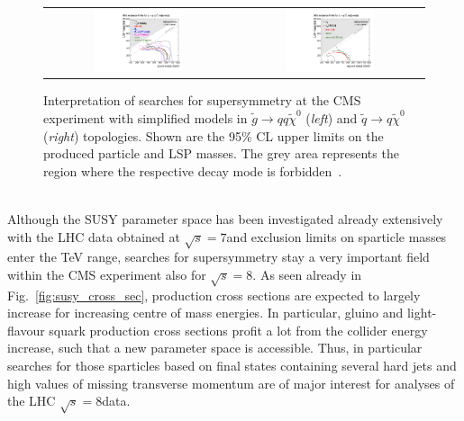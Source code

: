 \begin{figure}[!tp]
  \centering 
  \begin{tabular}{cc}
    \includegraphics[width=0.49\textwidth]{figures/T1_7TeV.pdf} &
    \includegraphics[width=0.49\textwidth]{figures/T2_7TeV.pdf}
  \end{tabular}
  \caption{Interpretation of searches for supersymmetry at the CMS experiment with simplified models in $\tilde{g} \rightarrow qq\tilde{\chi}^0$ (\textit{left}) and $\tilde{q} \rightarrow q \tilde{\chi}^0$ (\textit{right}) topologies. Shown are the 95\% CL upper limits on the produced particle and LSP masses. The grey area represents the region where the respective decay mode is forbidden~\cite{Chatrchyan:2013sza}.}
  \label{fig:SMS_7TeV}
\end{figure}
\\
Although the SUSY parameter space has been investigated already extensively with the LHC data obtained at $\sqrt{s} = 7$\tev and exclusion limits on sparticle masses enter the TeV range, searches for supersymmetry stay a very important field within the CMS experiment also for $\sqrt{s} = 8$\tev. As seen already in Fig.~\ref{fig:susy_cross_sec}, production cross sections are expected to largely increase for increasing centre of mass energies. In particular, gluino and light-flavour squark production cross sections profit a lot from the collider energy increase, such that a new parameter space is accessible. Thus, in particular searches for those sparticles based on final states containing several hard jets and high values of missing transverse momentum are of major interest for analyses of the LHC $\sqrt{s} = 8$\tev data.   






